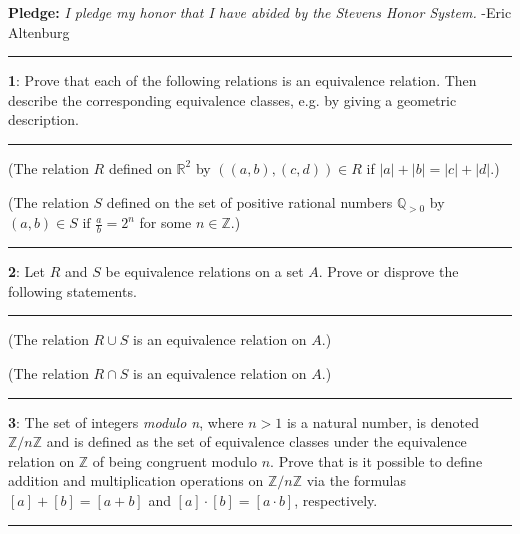 \documentclass[11pt]{article}
\newcommand\question[2]{\vspace{.25in}\hrule\textbf{#1}: #2\vspace{.5em}\hrule\vspace{.10in}}
\renewcommand\part[1]{\vspace{.10in}(#1)\par}
\newcommand{\R}{\mathbb{R}}
\newcommand{\Z}{\mathbb{Z}}
\newcommand{\Q}{\mathbb{Q}}
\begin{document}
\raggedright
\newcommand\NAME{Eric Altenburg}  %
\newcommand\COURSE{MA-240}
\newcommand\HWNUM{1}              %


\textbf{Pledge:} \textit{I pledge my honor that I have abided by the Stevens Honor System.} -Eric Altenburg

\question{1}{Prove that each of the following relations is an equivalence relation. Then describe the corresponding equivalence classes, e.g. by giving a geometric description.}

\part{The relation $R$ defined on $\R^2$ by $((a,b),(c,d)) \in R$ if $|a| + |b| = |c| + |d|.$}

\part{The relation $S$ defined on the set of positive rational numbers $\Q_{>0}$ by $(a,b) \in S \text{ if } \frac{a}{b}= 2^n$ for some $n \in \Z$.}

\question{2}{Let $R$ and $S$ be equivalence relations on a set $A$. Prove or disprove the following statements.}

\part{The relation $R \cup S$ is an equivalence relation on $A$.}

\part{The relation $R \cap S$ is an equivalence relation on $A$.}

\question{3}{The set of integers \textit{modulo n}, where $n > 1$ is a natural number, is denoted $\Z/n\Z$ and is defined as the set of equivalence classes under the equivalence relation on $\Z$ of being congruent modulo $n$. Prove that is it possible to define addition and multiplication operations on $\Z/n\Z$ via the formulas $[a]+[b] = [ a + b]$ and $[a] \cdot [b] = [ a \cdot b]$, respectively.}

	
\end{document}
